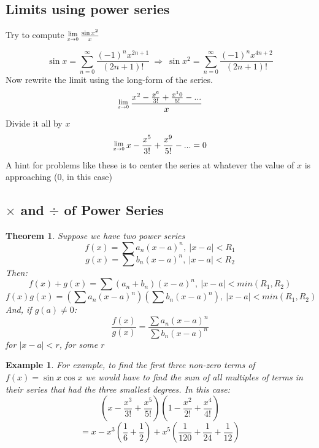 \documentclass[12 pt]{article}
\newcommand{\Lim}[1]{\raisebox{0.5ex}{\scalebox{0.8}{$\displaystyle \lim_{#1}\;$}}}
\newcommand{\sumz}{\sum\limits_{n=0}^{\infty}}
\newtheorem*{exmp*}{Example}
\newtheorem*{thrm}{Theorem}
\begin{document}
		\subsection{Limits using power series}

		Try to compute $\Lim{x\rightarrow 0}\frac{\sin{x^2}}{x}$

		$$\sin{x}=\sumz \frac{(-1)^nx^{2n+1}}{(2n+1)!}\ \Rightarrow\ \sin{x^2}=\sumz \frac{(-1)^nx^{4n+2}}{(2n+1)!}$$
		Now rewrite the limit using the long-form of the series.
		$$\Lim{x\rightarrow 0}\frac{x^2-\frac{x^6}{3!}+\frac{x^10}{5!}-...}{x}$$
		Divide it all by $x$
		$$\Lim{x\rightarrow 0} x-\frac{x^5}{3!}+\frac{x^9}{5!}-...=0$$
		A hint for problems like these is to center the series at whatever the value of $x$ is approaching (0, in this case)

		\subsection{$\times$ and $\div$ of Power Series}

		\begin{thrm}Suppose we have two power series\\
			$$f(x)=\sum a_n(x-a)^n, \ \lvert x-a\rvert<R_1$$
			$$g(x)=\sum b_n(x-a)^n, \ \lvert x-a\rvert<R_2$$
			Then:
			$$f(x)+g(x)= \sum (a_n+b_n)(x-a)^n, \ \lvert x-a\rvert<min(R_1,R_2)$$
			$$f(x)g(x)=(\sum a_n(x-a)^n)(\sum b_n(x-a)^n), \ \lvert x-a\rvert<min(R_1,R_2)$$
			And, if $g(a)\neq 0$:
			$$\frac{f(x)}{g(x)}=\frac{\sum a_n(x-a)^n}{\sum b_n(x-a)^n}$$
			for $\lvert x-a\rvert<r$, for some $r$
		\end{thrm}
		\begin{exmp*}For example, to find the first three non-zero terms of $f(x)=\sin{x}\cos{x}$ we would have to find the sum of all multiples of terms in their series that had the three smallest degrees. In this case:
			$$(x-\frac{x^3}{3!}+\frac{x^5}{5!})(1-\frac{x^2}{2!}+\frac{x^4}{4!})$$
			$$=x-x^3(\frac{1}{6}+\frac{1}{2})+x^5(\frac{1}{120}+\frac{1}{24}+\frac{1}{12})$$
		\end{exmp*}
\end{document}
